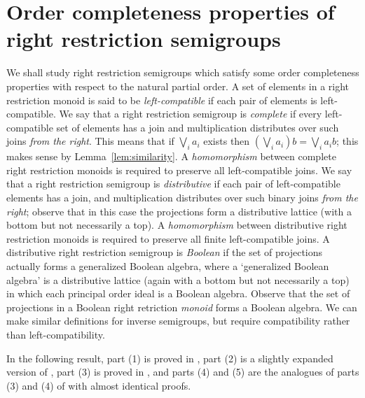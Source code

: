 \documentclass[a4paper]{amsart}
\begin{document}
\section{Order completeness properties of right restriction semigroups}


We shall study right restriction semigroups which satisfy
some order completeness properties with respect to the natural partial order.
A set of elements in a right restriction monoid is said to be {\em left-compatible}
if each pair of elements is left-compatible.
We say that a right restriction semigroup is {\em complete}
if every left-compatible set of elements has a join
and multiplication distributes over such joins {\em from the right}.
This means that if $\bigvee_{i} a_{i}$ exists then $\left( \bigvee_{i} a_{i} \right)b = \bigvee_{i} a_{i}b$;
this makes sense by Lemma~\ref{lem:similarity}.
A {\em homomorphism} between complete right restriction monoids is required to preserve
all left-compatible joins.
We say that a right restriction semigroup is {\em distributive}
if each pair of left-compatible elements has a join,
and multiplication distributes over such binary joins {\em from the right};
observe that in this case the projections form a distributive lattice (with a bottom but not necessarily a top).
A {\em homomorphism} between distributive right restriction monoids
is required to preserve all finite left-compatible joins.
A distributive right restriction semigroup is {\em Boolean}
if the set of projections actually forms a generalized Boolean algebra,
where a `generalized Boolean algebra' is a distributive lattice (again with a bottom but not necessarily a top)
in which each principal order ideal is a Boolean algebra.
Observe that the set of projections in a Boolean right retriction {\em monoid}
forms a Boolean algebra.
We can make similar definitions for inverse semigroups,
but require compatibility rather than left-compatibility.

In the following result, 
part (1) is proved in \cite[Proposition~2.14(i)]{CCG},
part (2) is a slightly expanded version of  \cite[Lemma 2.15]{KL},
part (3) is proved in \cite[Proposition 2.14(iii)]{CCG},
and
parts (4) and (5) are the analogues of parts (3) and (4) of \cite[Lemma 2.5]{Lawson2016} with almost identical proofs.
\end{document}
